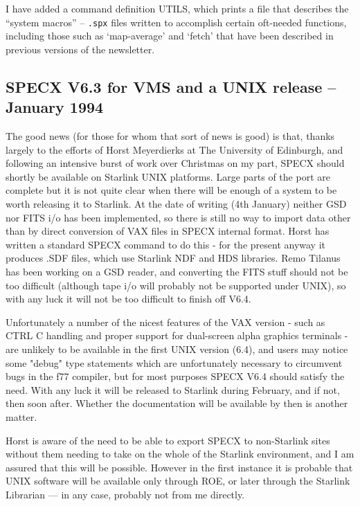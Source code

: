 \documentclass[twoside,11pt]{article}
\renewcommand{\_}{\texttt{\symbol{95}}}
\begin{document}
I have added a command definition UTILS, which prints a file that describes
the ``system macros'' -- \texttt{.spx} files written to accomplish certain
oft-needed functions, including those such as `map-average' and `fetch' that
have been described in previous versions of the newsletter.


\subsection{SPECX V6.3 for VMS and a UNIX release -- January 1994}

The good news (for those for whom that sort of news is good) is that, thanks
largely to the efforts of Horst Meyerdierks at The University of Edinburgh, and
following an intensive burst of work over Christmas on my part, SPECX should
shortly be available on Starlink UNIX platforms. Large parts of the port are
complete but it is not quite clear when there will be enough of a system to be
worth releasing it to Starlink. At the date of writing (4th January) neither
GSD nor FITS i/o has been implemented, so there is still no way to import data
other than by direct conversion of VAX files in SPECX internal format. Horst
has written a standard SPECX command to do this - for the present anyway it
produces .SDF files, which use Starlink NDF and HDS libraries. Remo Tilanus has
been working on a GSD reader, and converting the FITS stuff should not be too
difficult (although tape i/o will probably not be supported under UNIX), so
with any luck it will not be too difficult to finish off V6.4. 

Unfortunately a number of the nicest features of the VAX version - such as
CTRL C
handling and proper support for dual-screen alpha graphics terminals - are
unlikely to be available in the first UNIX version (6.4), and users may notice
some "debug" type statements which are unfortunately necessary to circumvent
bugs in the f77 compiler, but for most purposes SPECX V6.4 should satisfy
the need. With any luck it will be released to Starlink during February,
and if not, then soon after. Whether the documentation will be
available by then is another matter. 

Horst is aware of the need to be able to export SPECX to non-Starlink
sites without them needing to take on the whole of the Starlink environment,
and I am assured that this will be possible. However in the first instance
it is probable that UNIX software will be available only through ROE, or
later through the Starlink Librarian --- in any case, probably
not from me directly.
\end{document}
